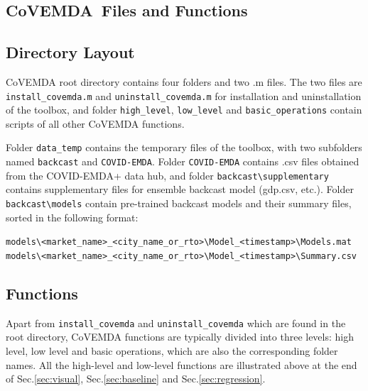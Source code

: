 \documentclass[10pt]{article}
\newcommand{\covemda}{CoVEMDA}
\numberwithin{equation}{section}
\numberwithin{table}{section}
\numberwithin{figure}{section}
\begin{document}
\begin{appendices}

\newpage
\section{\covemda{}~Files and Functions} \label{sec:}

\subsection{Directory Layout}

\covemda{} root directory contains four folders and two .m files. The two files are \verb!install_covemda.m! and \verb!uninstall_covemda.m! for installation and uninstallation of the toolbox, and folder \verb!high_level!, \verb!low_level! and \verb!basic_operations! contain scripts of all other \covemda{} functions.

Folder \verb!data_temp! contains the temporary files of the toolbox, with two subfolders named \verb!backcast! and \verb!COVID-EMDA!. Folder \verb!COVID-EMDA! contains .csv files obtained from the COVID-EMDA+ data hub, and folder \verb!backcast\supplementary! contains supplementary files for ensemble backcast model (gdp.csv, etc.). Folder \verb!backcast\models! contain pre-trained backcast models and their summary files, sorted in the following format:
\begin{center}
    \verb!models\<market_name>_<city_name_or_rto>\Model_<timestamp>\Models.mat!
    \verb!models\<market_name>_<city_name_or_rto>\Model_<timestamp>\Summary.csv!
\end{center}



\subsection{Functions}

Apart from \verb!install_covemda! and \verb!uninstall_covemda! which are found in the root directory, \covemda{} functions are typically divided into three levels: high level, low level and basic operations, which are also the corresponding folder names. All the high-level and low-level functions are illustrated above at the end of Sec.\ref{sec:visual}, Sec.\ref{sec:baseline} and Sec.\ref{sec:regression}.


\end{appendices}
\end{document}

